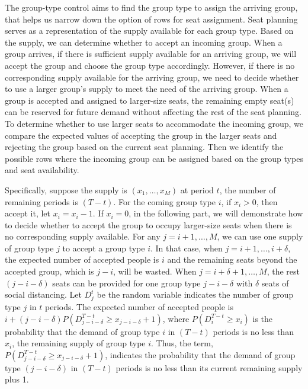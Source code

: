 
The group-type control aims to find the group type to assign the arriving group, that helps us narrow down the option of rows for seat assignment. Seat planning serves as a representation of the supply available for each group type. Based on the supply, we can determine whether to accept an incoming group. When a group arrives, if there is sufficient supply available for an arriving group, we will accept the group and choose the group type accordingly. However, if there is no corresponding supply available for the arriving group, we need to decide whether to use a larger group's supply to meet the need of the arriving group. When a group is accepted and assigned to larger-size seats, the remaining empty seat(s) can be reserved for future demand without affecting the rest of the seat planning. To determine whether to use larger seats to accommodate the incoming group, we compare the expected values of accepting the group in the larger seats and rejecting the group based on the current seat planning. Then we identify the possible rows where the incoming group can be assigned based on the group types and seat availability.


Specifically, suppose the supply is $(x_1, \ldots, x_M)$ at period $t$, the number of remaining periods is $(T-t)$. For the coming group type $i$, if $x_i > 0$, then accept it, let $x_i = x_i -1$.
If $x_i = 0$, in the following part, we will demonstrate how to decide whether to accept the group to occupy larger-size seats when there is no corresponding supply available. For any $j=i+1, \ldots, M$, we can use one supply of group type $j$ to accept a group type $i$. In that case, when $j = i+1, \ldots, i+\delta$, the expected number of accepted people is $i$ and the remaining seats beyond the accepted group, which is $j-i$, will be wasted. When $j = i+\delta+1, \ldots, M$, the rest $(j-i-\delta)$ seats can be provided for one group type $j-i-\delta$ with $\delta$ seats of social distancing. Let $D_j^{t}$ be the random variable indicates the number of group type $j$ in $t$ periods. The expected number of accepted people is $i + (j-i-\delta)P(D_{j-i-\delta}^{T-t} \geq x_{j-i-\delta}+1)$, where $P(D_i^{T-t} \geq x_i)$ is the probability that the demand of group type $i$ in $(T-t)$ periods is no less than $x_i$, the remaining supply of group type $i$. Thus, the term, $P(D_{j-i-\delta}^{T-t} \geq x_{j-i-\delta}+1)$, indicates the probability that the demand of group type $(j-i-\delta)$ in $(T-t)$ periods is no less than its current remaining supply plus 1. 

